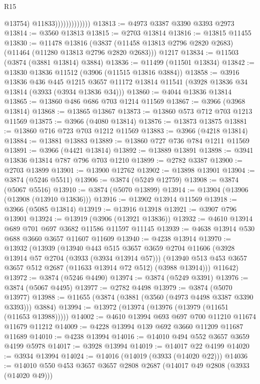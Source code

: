 \begin{lexlean}{R15}
\begin{coremodule}
                                @13754)
                              @11833)))))))))))))
@13813 := @4973 @3387 @3390 @3393 @2973
@13814 := @3560 @13813
@13815 := @2703 @13814
@13816 := @13815 @11455
@13830 := @11478
    @13816
    (@3837 (@11458 @13813 @2796 @2820 @2683) (@11464 (@11280 @13813 @2796 @2820 @2683)))
    @1217
@13834 := @11503 (@3874 (@3881 @13814) @3884)
@13836 := @11499 (@11501 @13834)
@13842 := @13830 @13836 @11512 (@3906 (@11515 @13816 @3884))
@13858 := @3916
    @13836
    @436
    @445
    @1215
    @3657
    @11172
    @13814
    @11541
    (@3928 @13836 @34 @13814 (@3933 (@3934 @13836 @34)))
@13860 := @4044 @13836 @13814
@13865 := @13860 @486 @686 @703 @1214 @11569
@13867 := @3966 (@3968 @13814)
@13868 := @13865 @13867
@13873 := @13860 @573 @712 @703 @1213 @11569
@13875 := @3966 (@4080 @13814)
@13876 := @13873 @13875
@13881 := @13860 @716 @723 @703 @1212 @11569
@13883 := @3966 (@4218 @13814)
@13884 := @13881 @13883
@13889 := @13860 @727 @736 @784 @1211 @11569
@13891 := @3966 (@4421 @13814)
@13892 := @13889 @13891
@13898 := @3941 @13836 @13814 @787 @796 @703 @1210
@13899 := @2782 @3387
@13900 := @2703 @13899
@13901 := @13900 @12762
@13902 := @13898 @13901
@13904 := @3874 (@5246 @5511)
@13906 := @3874 (@5249 @12759)
@13908 := @3874 (@5067 @5516)
@13910 := @3874 (@5070 @13899)
@13914 := @13904 (@13906 (@13908 (@13910 @13836)))
@13916 := @13902 @13914 @11569
@13918 := @3966 (@5085 @13814)
@13919 := @13916 @13918
@13921 := @3907 @796 @13901
@13924 := @13919 (@3906 (@13921 @13836))
@13932 := @4610 @13914 @689 @701 @697 @3682 @11586 @11597 @11145
@13939 := @4638 @13914 @530 @688 @3660 @3657 @11607 @11609
@13940 := @4238 @13914
@13970 := @13932
    (@13939
      (@13940
        @443
        @515
        @3657
        @3659
        @2704
        @11606
        (@3928 @13914 @57 @2704 (@3933 (@3934 @13914 @57)))
        (@13940 @513 @453 @3657 @3657 @512 @2687 (@11633 @13914 @72 @512) (@3988 @13914)))
      @11642)
@13972 := @3874 (@5246 @4490)
@13974 := @3874 (@5249 @3391)
@13976 := @3874 (@5067 @4495)
@13977 := @2782 @4498
@13979 := @3874 (@5070 @13977)
@13988 := @11655 (@3874 (@3881 (@3560 (@4973 @4498 @3387 @3390 @3393))) @3884)
@13994 := @13972 (@13974 (@13976 (@13979 (@11651 (@11653 @13988)))))
@14002 := @4610 @13994 @693 @697 @700 @11210 @11674 @11679 @11212
@14009 := @4228 @13994 @139 @692 @3660 @11209 @11687 @11689
@14010 := @4238 @13994
@14016 := @14010 @494 @552 @3657 @3659 @4199 @5978
@14017 := @3928 @13994
@14019 := @14017 @22 @4199
@14020 := @3934 @13994
@14024 := @14016 (@14019 (@3933 (@14020 @22)))
@14036 := @14010 @550 @453 @3657 @3657 @2808 @2687 (@14017 @49 @2808 (@3933 (@14020 @49)))

\end{coremodule}
\end{lexlean}

